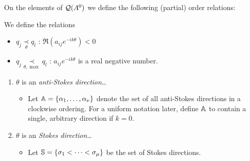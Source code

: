 On the elements of $\cQ(A^0)$ we define the following (partial) order
relations:
\begin{defn}
  We define the relations
  \begin{itemize}
    \item $q_j \underset{\theta}{\prec} q_l$
      :\Leftrightarrow{} $\Re(a_{ij}e^{-ik\theta})<0$
      \begin{comment}
        \Leftrightarrow{} $e^{(q_j-g_l)(t^{-1})}$ is flat at $0$ in a
        neighbourhood of the direction $\theta$.
        \TODO[define?]
      \end{comment}
    \item $q_j \underset{\theta,\max}{\prec} q_l$
      :\Leftrightarrow{} $a_{ij}e^{-ik\theta}$ is a real negative number.
      \begin{comment}
        \Leftrightarrow{} $q_{ij}(t^{-1})\in\R_{<0}$ along $\theta$.
      \end{comment}
      \begin{comment}
        \Leftrightarrow{} $e^{(q_j-g_l)(t^{-1})}$ is of maximal decay in the
        direction $\theta$.
        \TODO[define?]
      \end{comment}
  \end{itemize}
  \begin{comment}
    see \cite{Loday1994} Def I.4.4 for the definition in the ramified case,
    since
    \begin{itemize}
      \item In the unramified case these relations do not depend on the
        determination $\tilde\theta$ of $\theta$
    \end{itemize}
  \end{comment}
\end{defn}

\begin{defn}
  \begin{enumerate}
    \item $\theta$ is an \emph{anti-Stokes direction}\dots
      \begin{itemize}
        \item Let $\A=\{\alpha_1,\dots,\alpha_{\nu}\}$ denote the set of all
          anti-Stokes directions in a clockwise ordering. For a uniform
          notation later, define $\A$ to contain a single, arbitrary direction
          if $k=0$.
      \end{itemize}
    \item $\theta$ is an \emph{Stokes direction}\dots
      \begin{itemize}
        \item Let $\S=\{\sigma_1<\cdots<\sigma_\mu\}$ be the set of Stokes
          directions.
      \end{itemize}
  \end{enumerate}
\end{defn}



